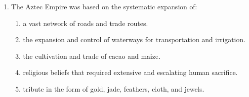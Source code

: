 \documentclass[12pt]{article}
\begin{document}
\begin{enumerate}[label=\arabic*.]
\begin{enumerate}[label=(\alph*)]
    \item a series of decisive military conquests against a rival king.
    \item a depiction of him as a corn god, a symbol of fertility and prosperity.
    \item a scene of him hunting and defeating a large jaguar.
    \item an eagle, a serpent, and a jaguar, all of which were important royal animals.
    \item him receiving a crown from the Mayan god of death and rebirth.
\end{enumerate}
\item The Aztec Empire was based on the systematic expansion of:
\begin{enumerate}[label=(\alph*)]
    \item a vast network of roads and trade routes.
    \item the expansion and control of waterways for transportation and irrigation.
    \item the cultivation and trade of cacao and maize.
    \item religious beliefs that required extensive and escalating human sacrifice.
    \item tribute in the form of gold, jade, feathers, cloth, and jewels.
\end{enumerate}
\end{enumerate}
\end{document}
